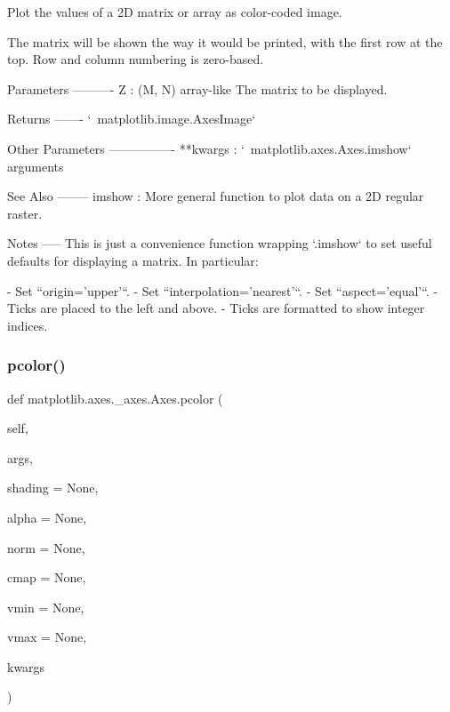 \begin{DoxyVerb}
\begin{DoxyVerb}Plot the values of a 2D matrix or array as color-coded image.

The matrix will be shown the way it would be printed, with the first
row at the top.  Row and column numbering is zero-based.

Parameters
----------
Z : (M, N) array-like
    The matrix to be displayed.

Returns
-------
`~matplotlib.image.AxesImage`

Other Parameters
----------------
**kwargs : `~matplotlib.axes.Axes.imshow` arguments

See Also
--------
imshow : More general function to plot data on a 2D regular raster.

Notes
-----
This is just a convenience function wrapping `.imshow` to set useful
defaults for displaying a matrix. In particular:

- Set ``origin='upper'``.
- Set ``interpolation='nearest'``.
- Set ``aspect='equal'``.
- Ticks are placed to the left and above.
- Ticks are formatted to show integer indices.\end{DoxyVerb}
 \mbox{\label{classmatplotlib_1_1axes_1_1__axes_1_1Axes_a2016d429b2baefecafba03ab4c1b40fb}} 
\subsubsection{\texorpdfstring{pcolor()}{pcolor()}}
{\footnotesize\ttfamily def matplotlib.\+axes.\+\_\+axes.\+Axes.\+pcolor (\begin{DoxyParamCaption}\item[{}]{self,  }\item[{}]{args,  }\item[{}]{shading = {\ttfamily None},  }\item[{}]{alpha = {\ttfamily None},  }\item[{}]{norm = {\ttfamily None},  }\item[{}]{cmap = {\ttfamily None},  }\item[{}]{vmin = {\ttfamily None},  }\item[{}]{vmax = {\ttfamily None},  }\item[{}]{kwargs }\end{DoxyParamCaption})}


\end{DoxyVerb}
